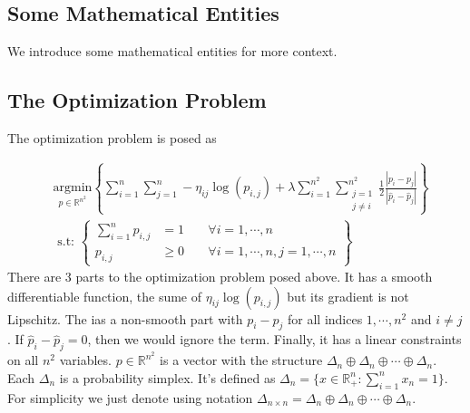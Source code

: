 \documentclass[11pt]{article}
\theoremstyle{definition}
\numberwithin{equation}{subsection}
\begin{document}
    \subsection{Some Mathematical Entities}
        We introduce some mathematical entities for more context. 

    \subsection{The Optimization Problem}
    \begin{linenumbers}
        The optimization problem is posed as 
    \end{linenumbers}
        \begin{align}
            &\underset{p \in \mathbb R^{n^2}}{\text{argmin}} 
            \left\lbrace
                \sum_{i = 1}^{n}\sum_{j = 1}^{n}
                    -\eta_{ij}\log(p_{i, j})
                + 
                \lambda \sum_{i=1}^{n^2}\sum_{\substack{j=1\\j\neq i}}^{n^2}
                \frac{1}{2}
                \frac{|p_{i} - p_j|}{|\hat p_{i} - \hat p_j|}
                \right\rbrace
                \\
                &\text{ s.t: }
                \left\lbrace
                \begin{aligned}
                    \sum_{i = 1}^{n} p_{i, j} &= 1 \; && \forall i =1, \cdots, n 
                    \\
                    p_{i, j} &\ge 0\; &&\forall i= 1,\cdots, n, j = 1,\cdots, n 
                \end{aligned}
                \right\rbrace
            \label{eqn:original_formulaion}
        \end{align}
        There are 3 parts to the optimization problem posed above. 
        It has a smooth differentiable function, the sume of $\eta_{ij}\log(p_{i,j})$ but its gradient is not Lipschitz. 
        The ias a non-smooth part with $p_i - p_j$ for all indices $1,\cdots, n^2$ and $i\neq j$. 
        If $\hat p_i - \hat p_j = 0$, then we would ignore the term. 
        Finally, it has a linear constraints on all $n^2$ variables. 
        $p\in \mathbb R^{n^2}$ is a vector with the structure $\Delta_n\oplus\Delta_n\oplus \cdots \oplus \Delta_n$. 
        Each $\Delta_n$ is a probability simplex. 
        It's defined as $\Delta_n = \{x\in \mathbb R^n_+ : \sum_{i =1}^{n}x_n = 1\}$. 
        For simplicity we just denote using notation $\Delta_{n\times n} = \Delta_n\oplus\Delta_n\oplus \cdots \oplus \Delta_n$. 
\end{document}
